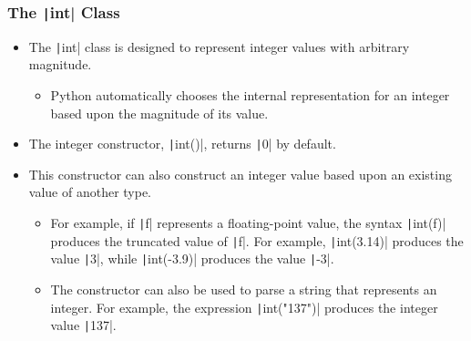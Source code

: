 \begin{frame}
    \frametitle{The \texttt|int| Class}

    \begin{itemize}
        \item The \texttt|int| class is designed to represent integer values with arbitrary magnitude.
              \begin{itemize}
                  \item Python automatically chooses the internal representation for an integer based upon the magnitude of its value.
              \end{itemize}
        \item The integer constructor, \texttt|int()|, returns \texttt|0| by default.
        \item This constructor can also construct an integer value based upon an existing value of another type.
              \begin{itemize}
                  \item For example, if \texttt|f| represents a floating-point value, the syntax \texttt|int(f)| produces the truncated value of \texttt|f|. For example, \texttt|int(3.14)| produces the value \texttt|3|, while \texttt|int(-3.9)| produces the value \texttt|-3|.
                  \item The constructor can also be used to parse a string that represents an integer. For example, the expression \texttt|int("137")| produces the integer value \texttt|137|.
              \end{itemize}
    \end{itemize}

\end{frame}

